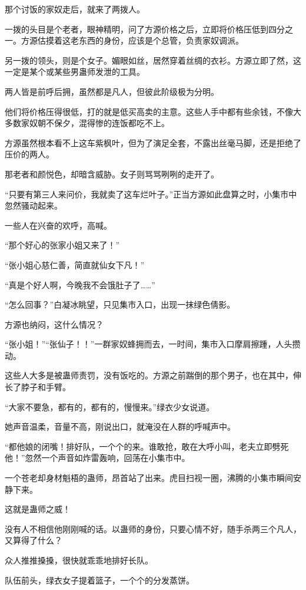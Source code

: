 \begin{this_body}
那个讨饭的家奴走后，就来了两拨人。

一拨的头目是个老者，眼神精明，问了方源价格之后，立即将价格压低到四分之一。方源估摸着这老东西的身份，应该是个总管，负责家奴调派。

另一拨的领头，则是个女子。媚眼如丝，居然穿着丝绸的衣衫。方源立即了然，这一定是某个或某些男蛊师发泄的工具。

两人皆是前呼后拥，虽然都是凡人，但彼此阶级极为分明。

他们将价格压得很低，打的就是低买高卖的主意。这些人手中都有些余钱，不像大多数家奴朝不保夕，混得惨的连饭都吃不上。

方源虽然根本看不上这车紫枫叶，但为了演足全套，不露出丝毫马脚，还是拒绝了压价的两人。

那老者和颜悦色，却暗含威胁。女子则骂骂咧咧的走开了。

“只要有第三人来问价，我就卖了这车烂叶子。”正当方源如此盘算之时，小集市中忽然骚动起来。

一些人在兴奋的欢呼，高喊。

“那个好心的张家小姐又来了！”

“张小姐心慈仁善，简直就仙女下凡！”

“真是个好人啊，今晚我不会饿肚子了……”

“怎么回事？”白凝冰眺望，只见集市入口，出现一抹绿色倩影。

方源也纳闷，这什么情况？

“张小姐！”“张仙子！！”一群家奴蜂拥而去，一时间，集市入口摩肩擦踵，人头攒动。

这些人大多是被蛊师责罚，没有饭吃的。方源之前踹倒的那个男子，也在其中，伸长了脖子和手臂。

“大家不要急，都有的，都有的，慢慢来。”绿衣少女说道。

她声音温柔，音量不高，刚说出口，就淹没在人群的呼喊声中。

“都他娘的闭嘴！排好队，一个个的来。谁敢抢，敢在大呼小叫，老夫立即劈死他！”忽然一个声音如炸雷轰响，回荡在小集市中。

一个苍老却身材魁梧的蛊师，昂首站了出来。虎目扫视一圈，沸腾的小集市瞬间安静下来。

这就是蛊师之威！

没有人不相信他刚刚喊的话。以蛊师的身份，只要心情不好，随手杀两三个凡人，又算得了什么？

众人推推搡搡，很快就乖乖地排好长队。

队伍前头，绿衣女子提着篮子，一个个的分发蒸饼。


\end{this_body}
